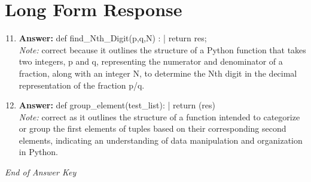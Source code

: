 \documentclass[12pt]{article}
\begin{document}
\section*{Long Form Response}
\begin{enumerate}[label=\arabic*.]
\setcounter{enumi}{10}
\item \textbf{Answer:} def find\_Nth\_Digit(p,q,N) : | return res;
\\ \textit{Note:} correct because it outlines the structure of a Python function that takes two integers, p and q, representing the numerator and denominator of a fraction, along with an integer N, to determine the Nth digit in the decimal representation of the fraction p/q.
\item \textbf{Answer:} def group\_element(test\_list): | return (res)
\\ \textit{Note:} correct as it outlines the structure of a function intended to categorize or group the first elements of tuples based on their corresponding second elements, indicating an understanding of data manipulation and organization in Python.
\end{enumerate}

\vfill
\noindent\textit{End of Answer Key}
\end{document}
